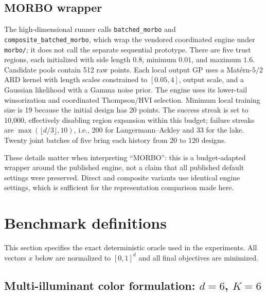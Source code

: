 \documentclass{article}
\begin{document}
\subsection{MORBO wrapper}

The high-dimensional runner calls \texttt{batched\_morbo} and
\texttt{composite\_batched\_morbo}, which wrap the vendored coordinated engine
under \texttt{morbo/}; it does not call the separate sequential prototype.
There are five trust regions, each initialized with side length $0.8$, minimum
$0.01$, and maximum $1.6$.  Candidate pools contain 512 raw points.  Each local
output GP uses a Mat\'ern-$5/2$ ARD kernel with length scales constrained to
$[0.05,4]$, output scale, and a Gaussian likelihood with a Gamma noise prior.
The engine uses its lower-tail winsorization and coordinated Thompson/HVI
selection.  Minimum local training size is 19 because the initial design has
20 points.  The success streak is set to 10,000, effectively disabling region
expansion within this budget; failure streaks are
$\max(\lfloor d/3\rfloor,10)$, i.e., 200 for Langermann--Ackley and 33 for the
lake.  Twenty joint batches of five bring each history from 20 to 120 designs.

These details matter when interpreting ``MORBO'': this is a budget-adapted
wrapper around the published engine, not a claim that all published default
settings were preserved.  Direct and composite variants use identical engine
settings, which is sufficient for the representation comparison made here.

\section{Benchmark definitions}
\label{app:benchmarks}

This section specifies the exact deterministic oracle used in the experiments.
All vectors $x$ below are normalized to $[0,1]^d$ and all final objectives are
minimized.

\subsection{Multi-illuminant color formulation: $d=6$, $K=6$}
\end{document}
